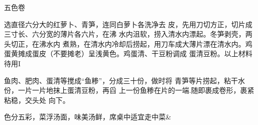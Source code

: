 \begin{recipe}{五色卷}

\ingredients



\cooking

\step 选直径六分大的红萝卜、青笋，连同白萝卜各洗净去 皮，先用刀切方正，切片成三寸长、六分宽的薄片各六片，在沸 水内沮软，捞入清水内漂起。冬笋剥壳，两头切正，在沸水内 煮熟，在清水内冷却后捞起，用刀车成大薄片漂在清水内。鸡 蛋黄摊成蛋皮（不要摊老）呈浅黄色。鸡蛋清、干豆粉调成 蛋清豆粉。以上材料待用I

\step 鱼肉、肥肉、蛋清等搅成“鱼糁”，分成三十份，做时将 青笋等片捞起，粘干水份，一片一片地抹上蛋清豆粉，再舀 上一份鱼糁在片的一端.随即裹成卷形，裹紧粘稳，交头处 向下。

\notes

色分五彩，菜浮汤面，味美汤鲜，席桌中适宜走中菜&

\end{recipe}

